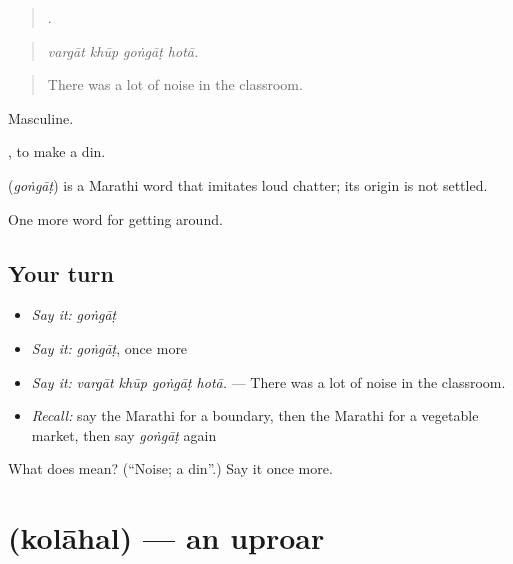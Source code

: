 \begin{quote}
   .
\end{quote}

\begin{quote}
\emph{vargāt khūp goṅgāṭ hotā.}
\end{quote}

\begin{quote}
There was a lot of noise in the classroom.
\end{quote}

Masculine.

 , to make a din.

\begin{cousinweb}
\textbf{} (\emph{goṅgāṭ}) is a Marathi word that imitates loud chatter; its origin is not settled.
\end{cousinweb}

\begin{grammarlens}[title={What you've built}]
One more word for getting around.
\end{grammarlens}

\subsection*{Your turn}
\begin{itemize}
\raggedright
  \item \emph{Say it:} \emph{goṅgāṭ}
  \item \emph{Say it:} \emph{goṅgāṭ}, once more
  \item \emph{Say it:} \emph{vargāt khūp goṅgāṭ hotā.} — There was a lot of noise in the classroom.
  \item \emph{Recall:} say the Marathi for a boundary, then the Marathi for a vegetable market, then say \emph{goṅgāṭ} again
\end{itemize}

\begin{tcolorbox}[breakable,colback=teal!4,colframe=teal!35!black,title={Before you move on}]
What does  mean? (\textquotedblleft{}Noise; a din\textquotedblright{}.) Say it once more.
\end{tcolorbox}
\section[\texorpdfstring{\mr{कोलाहल} (kolāhal)}{कोलाहल (kolāhal)}]{ (kolāhal) — an uproar}

\label{lesson:MR-C422-kolahal}



